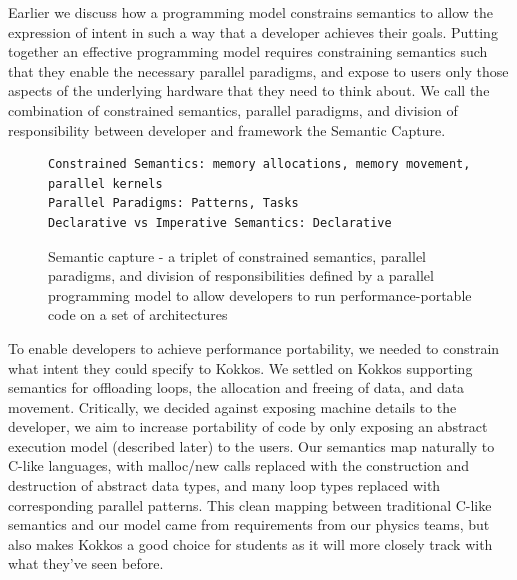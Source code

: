 Earlier we discuss how a programming model constrains semantics to allow the expression of intent in such a way that a developer achieves their goals. Putting together an effective programming model requires constraining semantics such that they enable the necessary parallel paradigms, and expose to users only those aspects of the underlying hardware that they need to think about. We call the combination of constrained semantics, parallel paradigms, and division of responsibility between developer and framework the Semantic Capture.

\begin{figure}[h]
\begin{Verbatim}[frame=leftline]
Constrained Semantics: memory allocations, memory movement, parallel kernels
Parallel Paradigms: Patterns, Tasks
Declarative vs Imperative Semantics: Declarative
\end{Verbatim}
\caption{Semantic capture - a triplet of constrained semantics, parallel paradigms, and division of responsibilities defined by a parallel programming model to allow developers to run performance-portable code on a set of architectures}
\label{figSemCapture}
\end{figure}


To enable developers to achieve performance portability, we needed to constrain what intent they could specify to Kokkos. We settled on Kokkos supporting semantics for offloading loops, the allocation and freeing of data, and data movement. Critically, we decided against exposing machine details to the developer, we aim to increase portability of code by only exposing an abstract execution model (described later) to the users. Our semantics map naturally to C-like languages, with malloc/new calls replaced with the construction and destruction of abstract data types, and many loop types replaced with corresponding parallel patterns. This clean mapping between traditional C-like semantics and our model came from requirements from our physics teams, but also makes Kokkos a good choice for students as it will more closely track with what they've seen before. 

